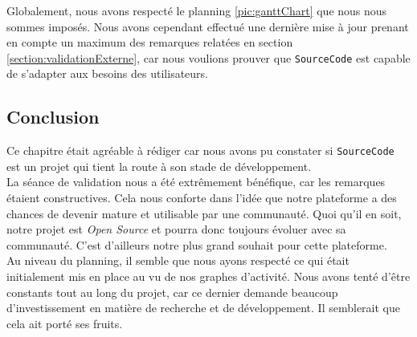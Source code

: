 Globalement, nous avons respecté le planning \ref{pic:ganttChart} que nous nous sommes imposés. Nous avons cependant effectué une dernière mise à jour prenant en compte un maximum des remarques relatées en section \ref{section:validationExterne}, car nous voulions prouver que \texttt{SourceCode} est capable de s'adapter aux besoins des utilisateurs.

\subsection{Conclusion}

Ce chapitre était agréable à rédiger car nous avons pu constater si \texttt{SourceCode} est un projet qui tient la route à son stade de développement.\\

La séance de validation nous a été extrêmement bénéfique, car les remarques étaient constructives. Cela nous conforte dans l'idée que notre plateforme a des chances de devenir mature et utilisable par une communauté. Quoi qu'il en soit, notre projet est \textit{Open Source} et pourra donc toujours évoluer avec sa communauté. C'est d'ailleurs notre plus grand souhait pour cette plateforme.\\

Au niveau du planning, il semble que nous ayons respecté ce qui était initialement mis en place au vu de nos graphes d'activité. Nous avons tenté d'être constants tout au long du projet, car ce dernier demande beaucoup d'investissement en matière de recherche et de développement. Il semblerait que cela ait porté ses fruits.